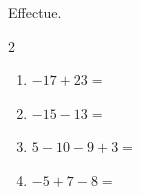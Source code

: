 \documentclass[parskip=half-,DIV=12,twoside=semi, 12pt]{scrartcl}
\begin{document}
\begin{appliquer}[points=2]
    Effectue.
    \begin{multicols}{2}
        \begin{enumerate}[itemsep=2cm]
            \item $-17+23=$
            \item $-15-13=$
            \item $5-10-9+3=$
            \item $-5+7-8=$
        \end{enumerate}
    \end{multicols}
    \vspace{2cm}
\end{appliquer}
\end{document}
